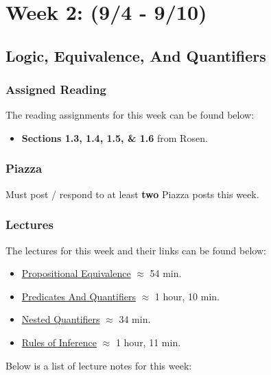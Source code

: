 \clearpage
\chapter{Week 2: (9/4 - 9/10)}

\section{Logic, Equivalence, And Quantifiers}

\subsection{Assigned Reading}

The reading assignments for this week can be found below:

\begin{itemize}
    \item \textbf{Sections 1.3, 1.4, 1.5, \& 1.6} from Rosen.
\end{itemize}

\subsection{Piazza}

Must post / respond to at least \textbf{two} Piazza posts this week.  

\subsection{Lectures}

The lectures for this week and their links can be found below:

\begin{itemize}
    \item \href{https://applied.cs.colorado.edu/mod/hvp/view.php?id=51566}{Propositional Equivalence} $\approx$ 54 min.
    \item \href{https://applied.cs.colorado.edu/mod/hvp/view.php?id=51567}{Predicates And Quantifiers} $\approx$ 1 hour, 10 min.
    \item \href{https://applied.cs.colorado.edu/mod/hvp/view.php?id=51568}{Nested Quantifiers} $\approx$ 34 min.
    \item \href{https://applied.cs.colorado.edu/mod/hvp/view.php?id=51569}{Rules of Inference} $\approx$ 1 hour, 11 min.
\end{itemize}

\noindent Below is a list of lecture notes for this week:

